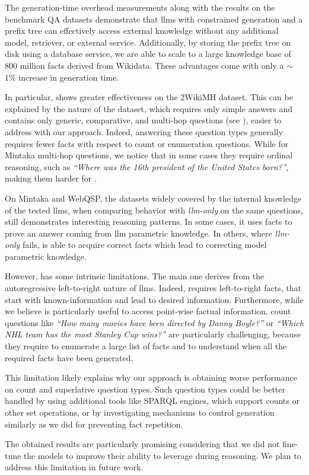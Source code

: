The generation-time overhead measurements along with the results on the benchmark QA datasets demonstrate that \acp{llm} with constrained generation and a prefix tree can effectively access external knowledge without any additional model, retriever, or external service. Additionally, by storing the prefix tree on disk using a database service, we are able to scale to a large knowledge base of 800 million facts derived from Wikidata. These advantages come with only a $\sim$1\% increase in generation time.

%
In particular,  shows greater effectiveness on the 2WikiMH dataset. This can be explained by the nature of the dataset, which requires only simple answers and contains only generic, comparative, and multi-hop questions (see ), easier to address with our approach. Indeed, answering these question types generally requires fewer facts with respect to count or enumeration questions.
%
% 
While for Mintaka multi-hop questions, we notice that in some cases they require ordinal reasoning, such as \textit{``Where was the 16th president of the United States born?''}, making them harder for .

On Mintaka and WebQSP, the datasets widely covered by the internal knowledge of the tested \acp{llm}, when comparing  behavior with \textit{\ac{llm}-only} on the same questions,  still demonstrates interesting reasoning patterns. In some cases, it uses facts to prove an answer coming from \ac{llm} parametric knowledge.
%
In others, where \textit{\ac{llm}-only} fails,  is able to acquire correct facts which lead to correcting model parametric knowledge.
% 


% 
However,  has some intrinsic limitations. The main one derives from the autoregressive left-to-right nature of \acp{llm}. Indeed,  requires left-to-right facts, that start with known-information and lead to desired information.
Furthermore, while we believe  is particularly useful to access point-wise factual information, count questions like \textit{``How many movies have been directed by Danny Boyle?''} or 
% 
\textit{``Which NHL team has the most Stanley Cup wins?''} 
are particularly challenging, because they require  to enumerate a large list of facts and to understand when all the required facts have been generated.

This limitation likely explains why our approach is obtaining worse performance on count and superlative question types. Such question types could be better handled by using additional tools like SPARQL engines, which support counts or other set operations, or by investigating mechanisms to control  generation similarly as we did for preventing fact repetition.

The obtained results are particularly promising considering that we did not fine-tune the models to improve their ability to leverage  during reasoning. We plan to address this limitation in future work.









